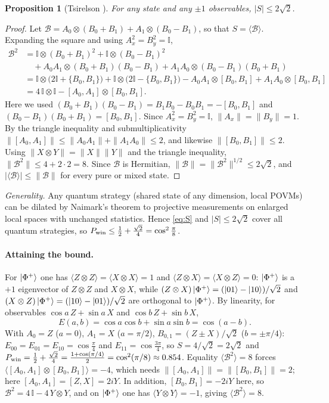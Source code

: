 \documentclass[11pt,a4paper]{article}
\newtheorem{proposition}{Proposition}
\begin{document}
\begin{proposition}[Tsirelson \cite{tsirelson}]\label{prop:tsirelson}
For any state and any $\pm1$ observables, $|S|\le2\sqrt2$.
\end{proposition}
\begin{proof}
Let $\mathcal B=A_0\otimes(B_0+B_1)+A_1\otimes(B_0-B_1)$, so that $S=\langle\mathcal B\rangle$. Expanding the square and using $A_x^2=B_y^2=\mathbb{I}$,
\begin{align*}
\mathcal B^2&=\mathbb{I}\otimes(B_0+B_1)^2+\mathbb{I}\otimes(B_0-B_1)^2\\
&\quad+A_0A_1\otimes(B_0+B_1)(B_0-B_1)+A_1A_0\otimes(B_0-B_1)(B_0+B_1)\\
&=\mathbb{I}\otimes\big(2\mathbb{I}+\{B_0,B_1\}\big)+\mathbb{I}\otimes\big(2\mathbb{I}-\{B_0,B_1\}\big)-A_0A_1\otimes[B_0,B_1]+A_1A_0\otimes[B_0,B_1]\\
&=4\,\mathbb{I}\otimes\mathbb{I}-[A_0,A_1]\otimes[B_0,B_1].
\end{align*}
Here we used $(B_0+B_1)(B_0-B_1)=B_1B_0-B_0B_1=-[B_0,B_1]$ and $(B_0-B_1)(B_0+B_1)=[B_0,B_1]$. Since $A_x^2=B_y^2=\mathbb I$, $\|A_x\|=\|B_y\|=1$. By the triangle inequality and submultiplicativity $\|[A_0,A_1]\|\le\|A_0A_1\|+\|A_1A_0\|\le2$, and likewise $\|[B_0,B_1]\|\le2$. Using $\|X\otimes Y\|=\|X\|\|Y\|$ and the triangle inequality, $\|\mathcal B^2\|\le4+2\cdot2=8$. Since $\mathcal B$ is Hermitian, $\|\mathcal B\|=\|\mathcal B^2\|^{1/2}\le2\sqrt2$, and $|\langle\mathcal B\rangle|\le\|\mathcal B\|$ for every pure or mixed state.
\end{proof}
\emph{Generality.} Any quantum strategy (shared state of any dimension, local POVMs) can be dilated by Naimark's theorem \cite{nc} to projective measurements on enlarged local spaces with unchanged statistics. Hence \cref{eq:S} and $|S|\le2\sqrt2$ cover all quantum strategies, so $P_{\rm win}\le\frac12+\frac{\sqrt2}{4}=\cos^2\frac\pi8$.
\paragraph{Attaining the bound.} For $\ket{\Phi^+}$ one has $\langle Z\otimes Z\rangle=\langle X\otimes X\rangle=1$ and $\langle Z\otimes X\rangle=\langle X\otimes Z\rangle=0$: $\ket{\Phi^+}$ is a $+1$ eigenvector of $Z\otimes Z$ and $X\otimes X$, while $(Z\otimes X)\ket{\Phi^+}=(\ket{01}-\ket{10})/\sqrt2$ and $(X\otimes Z)\ket{\Phi^+}=(\ket{10}-\ket{01})/\sqrt2$ are orthogonal to $\ket{\Phi^+}$. By linearity, for observables $\cos a\,Z+\sin a\,X$ and $\cos b\,Z+\sin b\,X$,
\[
E(a,b)=\cos a\cos b+\sin a\sin b=\cos(a-b).
\]
With $A_0=Z$ ($a=0$), $A_1=X$ ($a=\pi/2$), $B_{0,1}=(Z\pm X)/\sqrt2$ ($b=\pm\pi/4$): $E_{00}=E_{01}=E_{10}=\cos\frac\pi4$ and $E_{11}=\cos\frac{3\pi}4$, so $S=4/\sqrt2=2\sqrt2$ and $P_{\rm win}=\tfrac12+\tfrac{\sqrt2}{4}=\tfrac{1+\cos(\pi/4)}{2}=\cos^2(\pi/8)\approx0.854$. Equality $\langle\mathcal B^2\rangle=8$ forces $\langle[A_0,A_1]\otimes[B_0,B_1]\rangle=-4$, which needs $\|[A_0,A_1]\|=\|[B_0,B_1]\|=2$; here $[A_0,A_1]=[Z,X]=2iY$. In addition, $[B_0,B_1]=-2iY$ here, so $\mathcal B^2=4\,\mathbb{I}-4\,Y\otimes Y$, and on $\ket{\Phi^+}$ one has $\langle Y\otimes Y\rangle=-1$, giving $\langle\mathcal B^2\rangle=8$.
\end{document}
